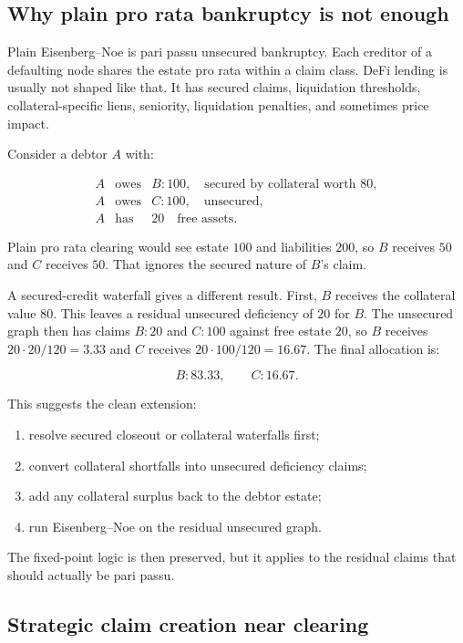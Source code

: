 \documentclass[11pt,oneside]{article}
\begin{document}
\subsection{Why plain pro rata bankruptcy is not enough}

Plain Eisenberg--Noe is pari passu unsecured bankruptcy. Each creditor of a
defaulting node shares the estate pro rata within a claim class. DeFi lending is
usually not shaped like that. It has secured claims, liquidation thresholds,
collateral-specific liens, seniority, liquidation penalties, and sometimes
price impact.

Consider a debtor $A$ with:

\[
\begin{array}{rcl}
  A & \text{owes} & B: 100, \quad \text{secured by collateral worth } 80,\\
  A & \text{owes} & C: 100, \quad \text{unsecured},\\
  A & \text{has} & 20 \quad \text{free assets}.
\end{array}
\]

Plain pro rata clearing would see estate $100$ and liabilities $200$, so $B$
receives $50$ and $C$ receives $50$. That ignores the secured nature of $B$'s
claim.

A secured-credit waterfall gives a different result. First, $B$ receives the
collateral value $80$. This leaves a residual unsecured deficiency of $20$ for
$B$. The unsecured graph then has claims $B:20$ and $C:100$ against free estate
$20$, so $B$ receives $20\cdot 20/120=3.33$ and $C$ receives
$20\cdot 100/120=16.67$. The final allocation is:

\[
  B:83.33,\qquad C:16.67.
\]

This suggests the clean extension:

\begin{enumerate}[leftmargin=1.5em]
  \item resolve secured closeout or collateral waterfalls first;
  \item convert collateral shortfalls into unsecured deficiency claims;
  \item add any collateral surplus back to the debtor estate;
  \item run Eisenberg--Noe on the residual unsecured graph.
\end{enumerate}

The fixed-point logic is then preserved, but it applies to the residual claims
that should actually be pari passu.

\subsection{Strategic claim creation near clearing}
\end{document}
